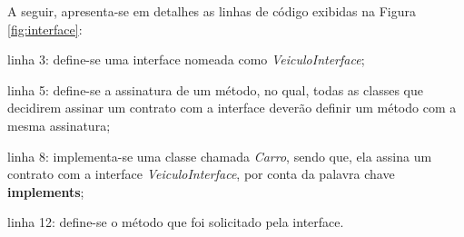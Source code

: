 A seguir, apresenta-se em detalhes as linhas de código exibidas na Figura
\ref{fig:interface}:

\begin{alineas}
    \item linha 3: define-se uma interface nomeada como
    \textit{VeiculoInterface};
    \item linha 5: define-se a assinatura de um método, no qual, todas as
    classes que decidirem assinar um contrato com a interface deverão definir um
    método com a mesma assinatura;
    \item linha 8: implementa-se uma classe chamada \textit{Carro}, sendo que,
    ela assina um contrato com a interface \textit{VeiculoInterface}, por conta
    da palavra chave \textbf{implements};
    \item linha 12: define-se o método que foi solicitado pela interface.
\end{alineas}
